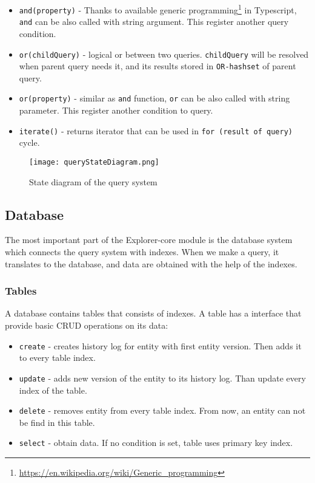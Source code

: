 \begin{itemize}
    \item \texttt{and(property)} - Thanks to available generic programming\footnote{\url{https://en.wikipedia.org/wiki/Generic_programming}} in Typescript, \texttt{and} can be also called with string argument. This register another query condition.
    \item \texttt{or(childQuery)} - logical or between two queries. \texttt{childQuery} will be resolved when parent query needs it, and its results stored in \texttt{OR-hashset} of parent query. 
    \item \texttt{or(property)} - similar as \texttt{and} function, \texttt{or} can be also called with string parameter. This register another condition to query.
    \item \texttt{iterate()} - returns iterator that can be used in \texttt{for (result of query)} cycle.
\end{itemize}


\begin{figure}[h]
    \centering
    \texttt{[image: queryStateDiagram.png]}
    \caption{State diagram of the query system}
    \label{queryStateDiagram}
\end{figure}


\subsection{Database}
The most important part of the Explorer-core module is the database system which connects the query system with indexes. When we make a query, it translates to the database, and data are obtained with the help of the indexes.

\subsubsection{Tables}
A database contains tables that consists of indexes. A table has a interface that provide basic CRUD operations on its data:
\begin{itemize}
    \item \texttt{create} - creates history log for entity with first entity version. Then adds it to every table index.
    \item \texttt{update} - adds new version of the entity to its history log. Than update every index of the table.
    \item \texttt{delete} - removes entity from every table index. From now, an entity can not be find in this table.
    \item \texttt{select} - obtain data. If no condition is set, table uses primary key index.
\end{itemize}

